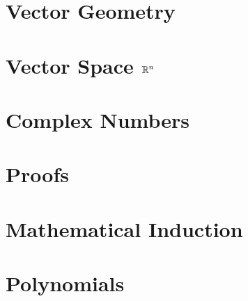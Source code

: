  \chapter{Vector Geometry}\label{chap:4}
 	
 	
 	
 	
	
        


\chapter{Vector Space \texorpdfstring{$\mathbb{R}^n$}{Rn}}\label{chap:5}
  	
  	
  	
  	
  	
  	
  	
        

\appendix
\renewcommand\chaptername{Appendix}
\chapter{Complex Numbers}\label{chap:appacomplexnumbers}
	

\chapter{Proofs}\label{chap:appbproofs}
	

\chapter{Mathematical Induction}\label{chap:appcinduction}
	

\chapter{Polynomials}\label{chap:appdpolynomials}
	

